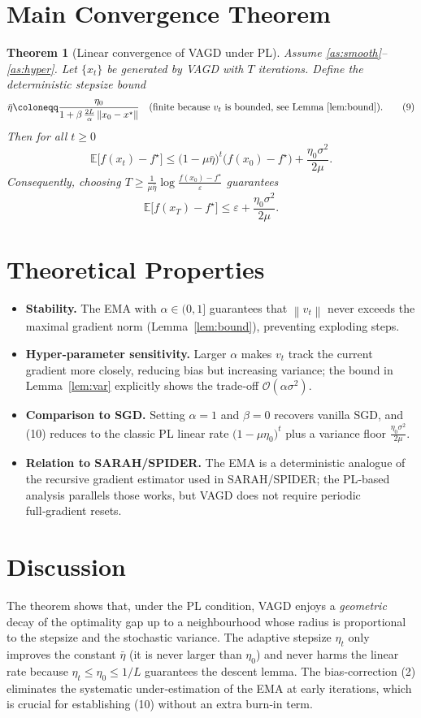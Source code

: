 \documentclass{article}
\newtheorem{theorem}{Theorem}
\newcommand{\E}{\mathbb{E}}
\newcommand{\norm}[1]{\left\|#1\right\|}
\begin{document}
\section*{Main Convergence Theorem}
\begin{theorem}[Linear convergence of VAGD under PL]\label{thm:linear}
Assume \ref{as:smooth}–\ref{as:hyper}. Let $\{x_{t}\}$ be generated by VAGD with $T$ iterations.
Define the deterministic stepsize bound
\[
\bar\eta\coloneqq \frac{\eta_{0}}{1+\beta\,\frac{2L}{\alpha}\norm{x_{0}-x^{\star}}}
\quad\text{(finite because $v_{t}$ is bounded, see Lemma~\ref{lem:bound})}.
\tag{9}
\]
Then for all $t\ge 0$
\[
\E\!\bigl[f(x_{t})-f^{\star}\bigr]\le
\bigl(1-\mu\bar\eta\bigr)^{t}\bigl(f(x_{0})-f^{\star}\bigr)+\frac{\eta_{0}\sigma^{2}}{2\mu}.
\tag{10}
\]
Consequently, choosing $T\ge \frac{1}{\mu\bar\eta}\log\frac{f(x_{0})-f^{\star}}{\varepsilon}$ guarantees
\[
\E\!\bigl[f(x_{T})-f^{\star}\bigr]\le \varepsilon+\frac{\eta_{0}\sigma^{2}}{2\mu}.
\tag{11}
\]
\end{theorem}

\section*{Theoretical Properties}
\begin{itemize}
\item \textbf{Stability.} The EMA with $\alpha\in(0,1]$ guarantees that $\norm{v_{t}}$ never exceeds the maximal gradient norm (Lemma~\ref{lem:bound}), preventing exploding steps.
\item \textbf{Hyper‑parameter sensitivity.} Larger $\alpha$ makes $v_{t}$ track the current gradient more closely, reducing bias but increasing variance; the bound in Lemma~\ref{lem:var} explicitly shows the trade‑off $\mathcal{O}(\alpha\sigma^{2})$.
\item \textbf{Comparison to SGD.} Setting $\alpha=1$ and $\beta=0$ recovers vanilla SGD, and (10) reduces to the classic PL linear rate $\bigl(1-\mu\eta_{0}\bigr)^{t}$ plus a variance floor $\frac{\eta_{0}\sigma^{2}}{2\mu}$.
\item \textbf{Relation to SARAH/SPIDER.} The EMA is a deterministic analogue of the recursive gradient estimator used in SARAH/SPIDER; the PL‑based analysis parallels those works, but VAGD does not require periodic full‑gradient resets.
\end{itemize}

\section*{Discussion}
The theorem shows that, under the PL condition, VAGD enjoys a \emph{geometric} decay of the optimality gap up to a neighbourhood whose radius is proportional to the stepsize and the stochastic variance. The adaptive stepsize $\eta_{t}$ only improves the constant $\bar\eta$ (it is never larger than $\eta_{0}$) and never harms the linear rate because $\eta_{t}\le\eta_{0}\le 1/L$ guarantees the descent lemma. The bias‑correction (2) eliminates the systematic under‑estimation of the EMA at early iterations, which is crucial for establishing (10) without an extra burn‑in term.
\end{document}
